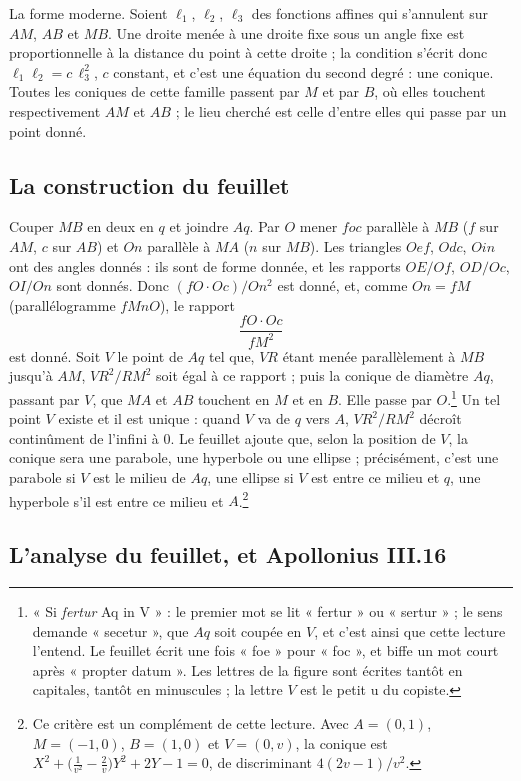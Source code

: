 \documentclass[11pt,a4paper]{article}
\begin{document}
La forme moderne. Soient $\ell_1$, $\ell_2$, $\ell_3$ des fonctions affines qui
s'annulent sur $AM$, $AB$ et $MB$. Une droite menée à une droite fixe sous un
angle fixe est proportionnelle à la distance du point à cette droite ; la
condition s'écrit donc $\ell_1\ell_2 = c\,\ell_3^2$, $c$ constant, et c'est une
équation du second degré : une conique. Toutes les coniques de cette famille
passent par $M$ et par $B$, où elles touchent respectivement $AM$ et $AB$ ; le
lieu cherché est celle d'entre elles qui passe par un point donné.

\subsection*{La construction du feuillet}

Couper $MB$ en deux en $q$ et joindre $Aq$. Par $O$ mener $foc$ parallèle à
$MB$ ($f$ sur $AM$, $c$ sur $AB$) et $On$ parallèle à $MA$ ($n$ sur $MB$). Les
triangles $Oef$, $Odc$, $Oin$ ont des angles donnés : ils sont de forme donnée,
et les rapports $OE/Of$, $OD/Oc$, $OI/On$ sont donnés. Donc
$(fO\cdot Oc)/On^2$ est donné, et, comme $On = fM$ (parallélogramme
$fMnO$), le rapport
\[ \frac{fO\cdot Oc}{fM^2} \]
est donné. Soit $V$ le point de $Aq$ tel que, $VR$ étant menée parallèlement à
$MB$ jusqu'à $AM$, $VR^2/RM^2$ soit égal à ce rapport ; puis la conique de
diamètre $Aq$, passant par $V$, que $MA$ et $AB$ touchent en $M$ et en $B$.
Elle passe par $O$.\footnote{« Si \emph{fertur} Aq in V » : le premier mot se
lit « fertur » ou « sertur » ; le sens demande « secetur », que $Aq$ soit
coupée en $V$, et c'est ainsi que cette lecture l'entend. Le feuillet écrit
une fois « foe » pour « foc », et biffe un mot court après « propter datum ».
Les lettres de la figure sont écrites tantôt en capitales, tantôt en
minuscules ; la lettre $V$ est le petit u du copiste.} Un tel point $V$ existe
et il est unique : quand $V$ va de $q$ vers $A$, $VR^2/RM^2$ décroît
continûment de l'infini à $0$. Le feuillet ajoute que, selon la position de
$V$, la conique sera une parabole, une hyperbole ou une ellipse ; précisément,
c'est une parabole si $V$ est le milieu de $Aq$, une ellipse si $V$ est entre
ce milieu et $q$, une hyperbole s'il est entre ce milieu et $A$.\footnote{Ce
critère est un complément de cette lecture. Avec $A = (0,1)$, $M = (-1,0)$,
$B = (1,0)$ et $V = (0,v)$, la conique est
$X^2 + \bigl(\tfrac1{v^2} - \tfrac2v\bigr)Y^2 + 2Y - 1 = 0$, de discriminant
$4(2v-1)/v^2$.}

\subsection*{L'analyse du feuillet, et Apollonius III.16}
\end{document}
